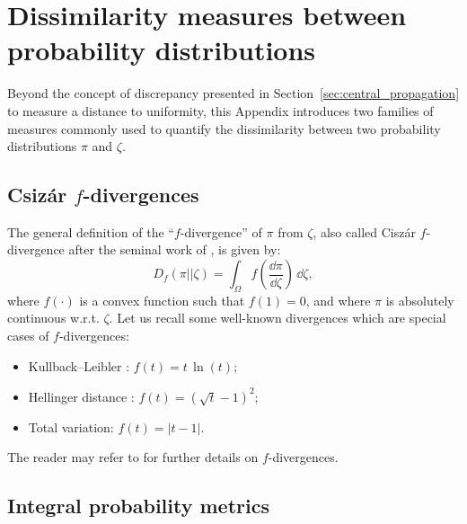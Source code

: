 \cleardoublepage
\chapter{Dissimilarity measures between probability distributions}
\label{apx:B}

Beyond the concept of discrepancy presented in Section~\ref{sec:central_propagation} to measure a distance to uniformity, this Appendix introduces two families of measures commonly used to quantify the dissimilarity between two probability distributions $\pi$ and $\zeta$.  


\section*{Csiz\'{a}r $f$-divergences}

The general definition of the ``$f$-divergence'' of $\pi$ from $\zeta$, also called Cisz\'{a}r $f$-divergence after the seminal work of \citet{csiszar_1964}, is given by: 
\begin{equation}
    D_{f}\left(\pi || \zeta\right) = \int_{\Omega} f\left(\frac{\dd \pi}{\dd \zeta}\right) \, \dd \zeta, 
\end{equation}
where $f(\cdot)$ is a convex function such that $f(1)=0$, and where $\pi$ is absolutely continuous w.r.t. $\zeta$. 
Let us recall some well-known divergences which are special cases of $f$-divergences:
\begin{itemize}
    \item Kullback–Leibler \citep{kullback_1951}: $f(t)=t \, \ln(t)$;
    \item Hellinger distance \citep{jeffreys_1946}: $f(t)=(\sqrt{t} - 1)^2$;
    \item Total variation: $f(t)= |t-1|$.
\end{itemize} 
The reader may refer to \citet{basu_2011} for further details on $f$-divergences.


\section*{Integral probability metrics}

